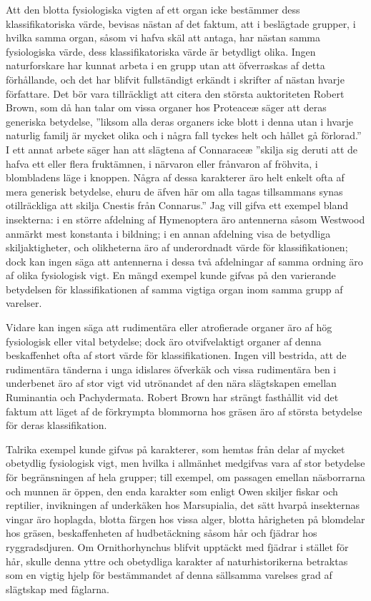 Att den blotta fysiologiska vigten af ett organ icke bestämmer dess klassifikatoriska värde, bevisas nästan af det faktum, att i beslägtade grupper, i hvilka samma organ, såsom vi hafva skäl att antaga, har nästan samma fysiologiska värde, dess klassifikatoriska värde är betydligt olika. Ingen naturforskare har kunnat arbeta i en grupp utan att öfverraskas af detta förhållande, och det har blifvit fullständigt erkändt i skrifter af nästan hvarje författare. Det bör vara tillräckligt att citera den största auktoriteten Robert Brown, som då han talar om vissa organer hos Proteaceæ säger att deras generiska betydelse, ”liksom alla deras organers icke blott i denna utan i hvarje naturlig familj är mycket olika och i några fall tyckes helt och hållet gå förlorad.” I ett annat arbete säger han att slägtena af Connaraceæ ”skilja sig deruti att de hafva ett eller flera fruktämnen, i närvaron eller frånvaron af fröhvita, i blombladens läge i knoppen. Några af dessa karakterer äro helt enkelt ofta af mera generisk betydelse, ehuru de äfven här om alla tagas tillsammans synas otillräckliga att skilja Cnestis från Connarus.” Jag vill gifva ett exempel bland insekterna: i en större afdelning af Hymenoptera äro antennerna såsom Westwood anmärkt mest konstanta i bildning; i en annan afdelning visa de betydliga skiljaktigheter, och olikheterna äro af underordnadt värde för klassifikationen; dock kan ingen säga att antennerna i dessa två afdelningar af samma ordning äro af olika fysiologisk vigt. En mängd exempel kunde gifvas på den varierande betydelsen för klassifikationen af samma vigtiga organ inom samma grupp af varelser.

Vidare kan ingen säga att rudimentära eller atrofierade organer äro af hög fysiologisk eller vital betydelse; dock äro otvifvelaktigt organer af denna beskaffenhet ofta af stort värde för klassifikationen. Ingen vill bestrida, att de rudimentära tänderna i unga idislares öfverkäk och vissa rudimentära ben i underbenet äro af stor vigt vid utrönandet af den nära slägtskapen emellan Ruminantia och Pachydermata. Robert Brown har strängt fasthållit vid det faktum att läget af de förkrympta blommorna hos gräsen äro af största betydelse för deras klassifikation.

Talrika exempel kunde gifvas på karakterer, som hemtas från delar af mycket obetydlig fysiologisk vigt, men hvilka i allmänhet medgifvas vara af stor betydelse för begränsningen af hela grupper; till exempel, om passagen emellan näsborrarna och munnen är öppen, den enda karakter som enligt Owen skiljer fiskar och reptilier, invikningen af underkäken hos Marsupialia, det sätt hvarpå insekternas vingar äro hoplagda, blotta färgen hos vissa alger, blotta hårigheten på blomdelar hos gräsen, beskaffenheten af hudbetäckning såsom hår och fjädrar hos ryggradsdjuren. Om Ornithorhynchus blifvit upptäckt med fjädrar i stället för hår, skulle denna yttre och obetydliga karakter af naturhistorikerna betraktas som en vigtig hjelp för bestämmandet af denna sällsamma varelses grad af slägtskap med fåglarna.

